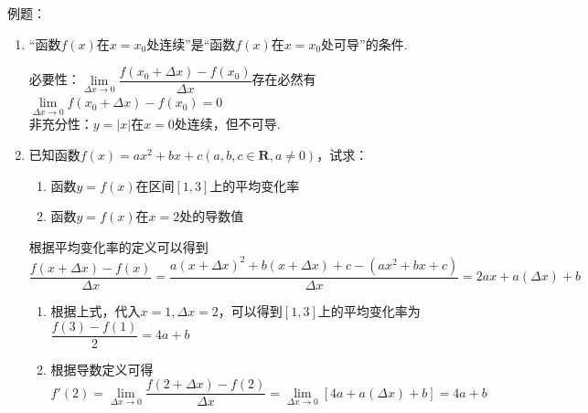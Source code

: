 例题：
\begin{enumerate}
    \item “函数$f(x)$在$x = x_0$处连续”是“函数$f(x)$在$x = x_0$处可导”的条件.
    \begin{jieda}
        必要性：$\lim\limits_{\Delta x \rightarrow 0}\dfrac{f(x_0+\Delta x) - f(x_0)}{\Delta x}$存在必然有$\lim\limits_{\Delta x \rightarrow 0}f(x_0+\Delta x) - f(x_0) = 0$ \\
        非充分性：$y = |x|$在$x = 0$处连续，但不可导.
    \end{jieda}
    \item 已知函数$f(x) = ax^2+bx+c (a, b, c \in \mathbf{R}, a \neq 0)$，试求：
    \begin{enumerate}
        \item 函数$y = f(x)$在区间$[1, 3]$上的平均变化率
        \item 函数$y = f(x)$在$x = 2$处的导数值
    \end{enumerate}
    \begin{jieda}
        根据平均变化率的定义可以得到 \\
        $\dfrac{f(x+\Delta x) - f(x)}{\Delta x} = \dfrac{a(x+\Delta x)^2+b(x+\Delta x) + c - (ax^2+bx+c)}{\Delta x} = 2ax + a(\Delta x) + b$
        \begin{enumerate}
            \item 根据上式，代入$x = 1, \Delta x = 2$，可以得到$[1, 3]$上的平均变化率为$\dfrac{f(3) - f(1)}{2} = 4a+b$
            \item 根据导数定义可得$f'(2) = \lim\limits_{\Delta x \to 0}\dfrac{f(2+\Delta x)-f(2)}{\Delta x} = \lim\limits_{\Delta x \to 0}[4a+a(\Delta x)+b] = 4a+b$
        \end{enumerate}
    \end{jieda}
\end{enumerate}

